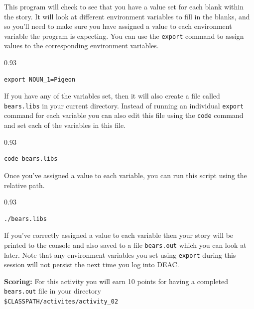 \documentclass[10pt, twoside]{article}
\begin{document}
This program will check to see that you have a value set for each blank within the story. It will look at different environment variables to fill in the blanks, and so you'll need to make sure you have assigned a value to each environment variable the program is expecting. You can use the \texttt{export} command to assign values to the corresponding environment variables.

\begin{boxedminipage}[]{0.93\textwidth}
\begin{verbatim}
export NOUN_1=Pigeon
\end{verbatim}
\end{boxedminipage}
\newline

If you have any of the variables set, then it will also create a file called \texttt{bears.libs} in your current directory. Instead of running an individual \texttt{export} command for each variable you can also edit this file using the \texttt{code} command and set each of the variables in this file.

\begin{boxedminipage}[]{0.93\textwidth}
\begin{verbatim}
code bears.libs
\end{verbatim}
\end{boxedminipage}
\newline

Once you've assigned a value to each variable, you can run this script using the relative path.

\begin{boxedminipage}[]{0.93\textwidth}
\begin{verbatim}
./bears.libs
\end{verbatim}
\end{boxedminipage}
\newline

If you've correctly assigned a value to each variable then your story will be printed to the console and also saved to a file \texttt{bears.out} which you can look at later. Note that any environment variables you set using \texttt{export} during this session will not persist the next time you log into DEAC.

\textbf{Scoring:} For this activity you will earn 10 points for having a completed \texttt{bears.out} file in your directory \\
\texttt{\$CLASSPATH/activites/activity\_02}
\end{document}

